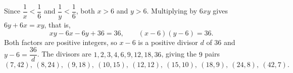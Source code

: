 Since $\dfrac1x<\dfrac16$ and $\dfrac1y<\dfrac16$, both $x>6$ and $y>6$. Multiplying by $6xy$ gives $6y+6x=xy$, that is,
\[xy-6x-6y+36=36,\qquad (x-6)(y-6)=36.\]
Both factors are positive integers, so $x-6$ is a positive divisor $d$ of $36$ and $y-6=\dfrac{36}{d}$. The divisors are $1,2,3,4,6,9,12,18,36$, giving the $9$ pairs
\[\boxed{(7,42),\ (8,24),\ (9,18),\ (10,15),\ (12,12),\ (15,10),\ (18,9),\ (24,8),\ (42,7)}.\]
